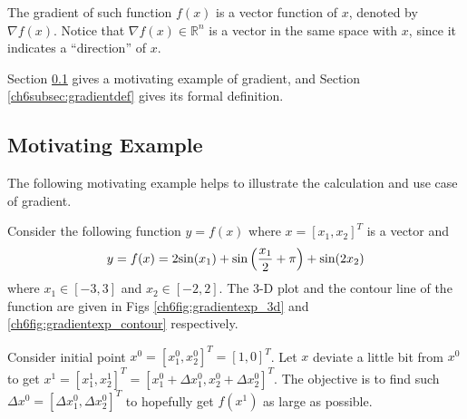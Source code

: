 The gradient of such function $f(x)$ is a vector function of $x$, denoted by $\nabla f(x)$. Notice that $\nabla f(x) \in \mathbb{R}^n$ is a vector in the same space with $x$, since it indicates a ``direction'' of $x$.

Section \ref{ch6subsec:gradientmotivatingexp} gives a motivating example of gradient, and Section \ref{ch6subsec:gradientdef} gives its formal definition.

\subsection{Motivating Example} \label{ch6subsec:gradientmotivatingexp}

The following motivating example helps to illustrate the calculation and use case of gradient.

\begin{shortbox}

Consider the following function $y=f(x)$ where $x = [x_1,x_2]^T$ is a vector and
\begin{eqnarray}
    y = f(x) = 2\textup{sin}(x_1) + \textup{sin}\left(\dfrac{x_1}{2} + \pi\right) + \textup{sin}(2x_2) \label{ch6eq:gradientexp_hill}
\end{eqnarray}
where $x_1\in[-3,3]$ and $x_2\in[-2,2]$. The 3-D plot and the contour line of the function are given in Figs \ref{ch6fig:gradientexp_3d} and \ref{ch6fig:gradientexp_contour} respectively.


Consider initial point $x^0 = [x_1^0, x_2^0]^T = [1,0]^T$. Let $x$ deviate a little bit from $x^0$ to get $x^1 = [x_1^1, x_2^1]^T = [x_1^0 + \Delta x_1^0, x_2^0 + \Delta x_2^0]^T$. The objective is to find such $\Delta x^0 = [\Delta x_1^0, \Delta x_2^0]^T$ to hopefully get $f(x^1)$ as large as possible.

\end{shortbox}

